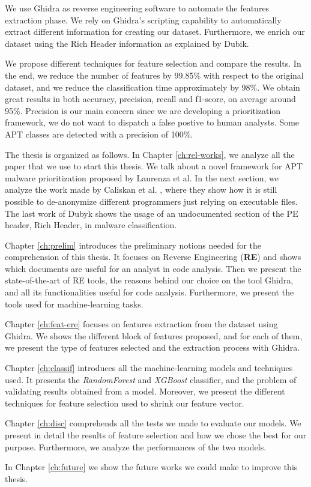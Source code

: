 We use Ghidra as reverse engineering software to automate the features extraction phase. We rely on Ghidra's scripting capability to automatically extract different information for creating our dataset. Furthermore, we enrich our dataset using the Rich Header information as explained by Dubik\cite{dubyk2019sans}.

We propose different techniques for feature selection and compare the results. In the end, we reduce the number of features by 99.85\% with respect to the original dataset, and we reduce the classification time approximately by 98\%. We obtain great results in both accuracy, precision, recall and f1-score, on average around 95\%. Precision is our main concern since we are developing a prioritization framework, we do not want to dispatch a false postive to human analysts. Some APT classes are detected with a precision of 100\%.


The thesis is organized as follows.
In Chapter \ref{ch:rel-works}, we analyze all the paper that we use to start this thesis. We talk about a novel framework for APT malware prioritization proposed by Laurenza et al. In the next section, we analyze the work made by Caliskan et al. \cite{caliskan2015anonymizing}, where they show how it is still possible to de-anonymize different programmers just relying on executable files. The last work of Dubyk \cite{dubyk2019sans} shows the usage of an undocumented section of the PE header, Rich Header, in malware classification.

Chapter \ref{ch:prelim} introduces the preliminary notions needed for the comprehension of this thesis. It focuses on Reverse Engineering (\textbf{RE}) and shows which documents are useful for an analyst in code analysis. Then we present the state-of-the-art of RE tools, the reasons behind our choice on the tool Ghidra, and all its functionalities useful for code analysis. Furthermore, we present the tools used for machine-learning tasks.

Chapter \ref{ch:feat-cre} focuses on features extraction from the dataset using Ghidra. We shows the different block of features proposed, and for each of them, we present the type of features selected and the extraction process with Ghidra.

Chapter \ref{ch:classif} introduces all the machine-learning models and techniques used. It presents the \textit{RandomForest} and \textit{XGBoost} classifier, and the problem of validating results obtained from a model. Moreover, we present the different techniques for feature selection used to shrink our feature vector.

Chapter \ref{ch:disc} comprehends all the tests we made to evaluate our models. We present in detail the results of feature selection and how we chose the best for our purpose.
Furthermore, we analyze the performances of the two models.

In Chapter \ref{ch:future} we show the future works we could make to improve this thesis. 